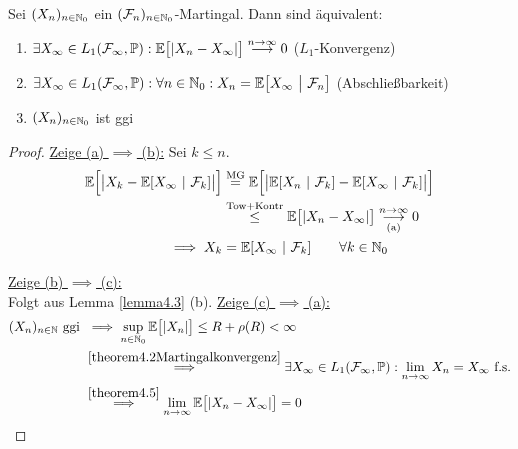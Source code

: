 \begin{theorem}\label{theorem4.6L1KonvergenzVonMartingalen}\enter
Sei $(X_n)_{n\in\mathbb{N}_0}$ ein $(\mathcal{F}_n)_{n\in\mathbb{N}_0}$-Martingal. Dann sind äquivalent:
\begin{enumerate}[label=(\alph*)]
\item $\begin{aligned}
\exists X_\infty\in L_1(\mathcal{F}_\infty,\mathbb{P}):\mathbb{E}\big[|X_n-X_\infty|\big]\stackrel{n\to\infty}{\longrightarrow}0
\end{aligned}$ ($L_1$-Konvergenz)
\item $\begin{aligned}
\exists X_\infty\in L_1(\mathcal{F}_\infty,\mathbb{P}):\forall n\in\mathbb{N}_0: X_n=\mathbb{E}\big[X_\infty~\big|~\mathcal{F}_n\big]
\end{aligned}$ (Abschließbarkeit)
\item $\begin{aligned}
(X_n)_{n\in\mathbb{N}_0}
\end{aligned}$ ist ggi
\end{enumerate}
\end{theorem}
\begin{proof}
\underline{Zeige (a) $\implies$ (b):} Sei $k\leq n$.
\begin{align*}
\mathbb{E}\Big[\big|X_k-\mathbb{E}[X_\infty~|~\mathcal{F}_k]\big|\Big]
&\stackrel{\text{MG}}{=}
\mathbb{E}\Big[\big|\mathbb{E}[X_n~|~\mathcal{F}_k]-\mathbb{E}[X_\infty~|~\mathcal{F}_k]\big|\Big]\\
&\stackrel{\text{Tow+Kontr}}{\leq}
\mathbb{E}\big[|X_n-X_\infty|\big]\underset{\text{(a)}}{\overset{n\to\infty}{\longrightarrow}}0\\
\implies X_k&=\mathbb{E}[X_\infty~|~\mathcal{F}_k]\qquad\forall k\in\mathbb{N}_0
\end{align*}

\underline{Zeige (b) $\implies$ (c):}\\
Folgt aus Lemma \ref{lemma4.3} (b).\nl
\underline{Zeige (c) $\implies$ (a):}
\begin{align*}
(X_n)_{n\in\mathbb{N}}\text{ ggi }&\implies\sup\limits_{n\in\mathbb{N}_0}\mathbb{E}\big[|X_n|\big]\leq R+\rho(R)<\infty\\
&\stackrel{\ref{theorem4.2Martingalkonvergenz}}{\implies}
\exists X_\infty\in L_1(\mathcal{F}_\infty,\mathbb{P}):\lim\limits_{n\to\infty} X_n=X_\infty\text{ f.s.}\\
&\stackrel{\ref{theorem4.5}}{\implies}
\lim\limits_{n\to\infty}\mathbb{E}\big[|X_n-X_\infty|\big]=0
\end{align*}
\end{proof}
